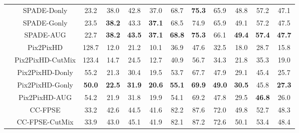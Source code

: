 \documentclass[final]{cvpr}
\newcommand\+{\mkern4mu}
\begin{document}
\begin{table*}[h]
{\begin{tabular}{@{}lc@{\hspace{0.3cm}}c@{\hspace{0.7cm}}ccc@{\hspace{0.7cm}}ccc@{\hspace{0.7cm}}ccc@{}}
			& \small SPADE-Donly & \small 23.2 & \small	38.0 & \small	42.8 & \small	37.0 & \small	68.7 & \small \textbf{75.3} & \small	65.9 & \small	48.8 & \small	57.2 & \small	47.1 \tabularnewline 
			& \small SPADE-Gonly & \small 23.5 & \small	\textbf{38.2} & \small 43.3 & \small \textbf{37.1} & \small	68.5 & \small	74.9 & \small	65.9 & \small	49.1 & \small 57.2 & \small	47.5 \tabularnewline 
			
			& \small \small SPADE-AUG & \small 22.7 & \small \textbf{38.2} & \small \textbf{43.5} & \small \textbf{37.1} & \small \textbf{68.8} & \small \textbf{75.3} & \small 66.1 & \small \textbf{49.4} & \small \textbf{57.4} & \small \textbf{47.7} \tabularnewline[0.2cm] 
			


			& \small Pix2PixHD & \small 128.7 & \small 12.0 & \small 21.2 & \small 10.1 & \small 36.9 & \small 47.6 & \small 32.5 & \small 18.0 & \small 28.7 & \small 15.8 \tabularnewline
			
			& \small Pix2PixHD-CutMix & \small 123.4 & \small	14.7 & \small	24.5 & \small	12.7 & \small	40.9 & \small	56.7 & \small	34.3 & \small	21.8 & \small	35.3 & \small	19.0 \tabularnewline
			
			& \small Pix2PixHD-Donly & \small 55.2 & \small	21.3 & \small	30.4 & \small	19.5 & \small	53.7 & \small	67.7 & \small	47.9 & \small 29.1 & \small 45.4 & \small 25.7 \tabularnewline
			& \small Pix2PixHD-Gonly & \small \textbf{50.0} & \small \textbf{22.5} & \small \textbf{31.9} & \small \textbf{20.6} & \small \textbf{55.1} & \small \textbf{69.9} & \small \textbf{49.0} & \small \textbf{30.5} & \small 45.8 & \small \textbf{27.3} \tabularnewline
						
			& \small Pix2PixHD-AUG & \small 54.2 & \small 21.9 & \small 31.8 & \small 19.9 & \small 54.1 & \small 69.2 & \small 47.8 & \small 29.5 & \small \textbf{46.8} & \small 26.0 \tabularnewline
			


\cmidrule(lr){2-12}	
			


			\multirow{15}{*}{  \rotatebox{90}{ADE20K }} & \small \small	CC-FPSE   & \small 33.2 & \small 42.6 & \small 44.5 & \small 41.6 & \small 82.2 & \small 87.6 & \small 72.0 & \small 49.8 & \small 52.7 & \small 48.3 \tabularnewline
			
			& \small CC-FPSE-CutMix & \small 33.9 & \small	43.0 & \small	45.1 & \small	41.9 & \small	82.1 & \small	87.2 & \small	72.6 & \small	50.1 & \small	53.4 & \small	48.4 \tabularnewline	
			

\end{tabular}}
\end{table*}
\end{document}
